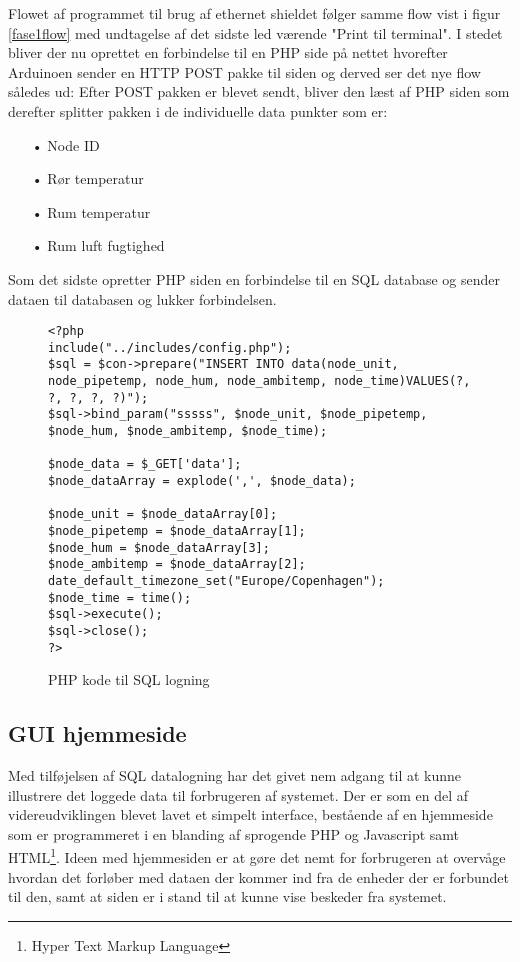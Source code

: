 Flowet af programmet til brug af ethernet shieldet følger samme flow vist i figur \ref{fase1flow}
med undtagelse af det sidste led værende "Print til terminal". I stedet bliver der nu oprettet en forbindelse til en PHP side på nettet hvorefter Arduinoen sender en HTTP POST pakke til siden og derved ser det nye flow således ud:
\newline
Efter POST pakken er blevet sendt, bliver den læst af PHP siden som derefter splitter pakken i de individuelle data punkter som er:
\begin{enumerate}
	\item[•]Node ID
	\item[•]Rør temperatur
	\item[•]Rum temperatur
	\item[•]Rum luft fugtighed
\end{enumerate}
Som det sidste opretter PHP siden en forbindelse til en SQL database og sender dataen til databasen og lukker forbindelsen.
\begin{figure}[!ht]
	\begin{lstlisting}
<?php
include("../includes/config.php");
$sql = $con->prepare("INSERT INTO data(node_unit, node_pipetemp, node_hum, node_ambitemp, node_time)VALUES(?, ?, ?, ?, ?)");
$sql->bind_param("sssss", $node_unit, $node_pipetemp, $node_hum, $node_ambitemp, $node_time);

$node_data = $_GET['data'];
$node_dataArray = explode(',', $node_data);

$node_unit = $node_dataArray[0];
$node_pipetemp = $node_dataArray[1];
$node_hum = $node_dataArray[3];
$node_ambitemp = $node_dataArray[2];
date_default_timezone_set("Europe/Copenhagen"); 
$node_time = time(); 
$sql->execute();
$sql->close();
?>
\end{lstlisting}
\caption{PHP kode til SQL logning}
\label{phpsql}
\end{figure}

\subsection{GUI hjemmeside}
Med tilføjelsen af SQL datalogning har det givet nem adgang til at kunne illustrere det loggede data til forbrugeren af systemet.
Der er som en del af videreudviklingen blevet lavet et simpelt interface, bestående af en hjemmeside som er programmeret i en blanding af sprogende PHP og Javascript samt HTML\footnote{Hyper Text Markup Language}.
\newline
Ideen med hjemmesiden er at gøre det nemt for forbrugeren at overvåge hvordan det forløber med dataen der kommer ind fra de enheder der er forbundet til den, samt at siden er i stand til at kunne vise beskeder fra systemet.


